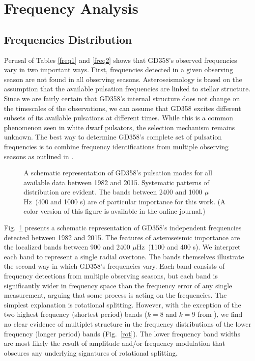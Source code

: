 \documentclass[12pt,preprint]{aastex}
\newcommand{\muHz}{\mbox{$\mu$Hz}}
\begin{document}
\section{Frequency Analysis}\label{analysis}

\subsection{Frequencies Distribution}

Perusal of Tables \ref{freq1} and \ref{freq2} shows that GD358's observed frequencies vary in two
important ways.  First, frequencies detected in a given observing season are not found 
in all observing seasons. Asteroseismology is based on the assumption that the available pulsation
frequencies are linked to stellar structure.  Since we are fairly certain that GD358's internal structure 
does not change on the timescales of the observations, we can assume that GD358 excites 
different subsets of its available pulsations at different times. While this is a common phenomenon
seen in white dwarf pulsators, the selection mechanism remains unknown. The best way to 
determine GD358's complete set of pulsation frequencies is to combine frequency identifications 
from multiple observing seasons as outlined in \citet{Kleinman98}.  

\begin{figure}
\caption{A schematic representation of GD358's pulsation modes for all available data between
1982 and 2015. Systematic patterns of distribution are evident. The bands between 2400 and 1000
\muHz\ (400 and 1000 s) are of particular importance for this work. (A color version of this 
figure is available in the online journal.)
\label{schematic}
}
\end{figure}

Fig.~\ref{schematic} presents a schematic representation of GD358's 
independent frequencies detected between 1982 and 2015.  
The features of asteroseismic importance are the localized bands between 900 and 2400
\muHz\ (1100 and 400 s). We interpret each band to represent a single radial overtone. The bands
themselves illustrate the second way in which GD358's frequencies vary. Each band consists of 
frequency detections from multiple observing seasons, but each band is significantly wider in 
frequency space than the frequency error of any single measurement, arguing that some process 
is acting on the frequencies. The simplest explanation is rotational splitting.  However, with the 
exception of the two highest frequency (shortest period) bands ($k=8$ and $k=9$ 
from \citet{Provencal09}), we find no clear evidence of multiplet structure in the frequency 
distributions of the lower frequency (longer period) bands (Fig.~\ref{rot}). The lower frequency band widths are 
most likely the result of amplitude and/or frequency modulation that obscures any underlying 
signatures of rotational splitting.  
\end{document}
